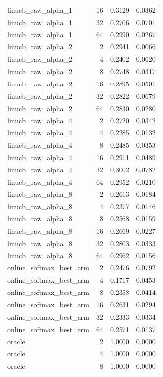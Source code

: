 \begin{table}[t]
\begin{tabular}{lrrr}
linucb\_raw\_alpha\_1 & 16 & 0.3129 & 0.0362 \\
linucb\_raw\_alpha\_1 & 32 & 0.2706 & 0.0701 \\
linucb\_raw\_alpha\_1 & 64 & 0.2990 & 0.0267 \\
linucb\_raw\_alpha\_2 & 2 & 0.2941 & 0.0066 \\
linucb\_raw\_alpha\_2 & 4 & 0.2402 & 0.0620 \\
linucb\_raw\_alpha\_2 & 8 & 0.2748 & 0.0317 \\
linucb\_raw\_alpha\_2 & 16 & 0.2895 & 0.0501 \\
linucb\_raw\_alpha\_2 & 32 & 0.2822 & 0.0679 \\
linucb\_raw\_alpha\_2 & 64 & 0.2830 & 0.0280 \\
linucb\_raw\_alpha\_4 & 2 & 0.2720 & 0.0342 \\
linucb\_raw\_alpha\_4 & 4 & 0.2285 & 0.0132 \\
linucb\_raw\_alpha\_4 & 8 & 0.2485 & 0.0353 \\
linucb\_raw\_alpha\_4 & 16 & 0.2911 & 0.0489 \\
linucb\_raw\_alpha\_4 & 32 & 0.3002 & 0.0782 \\
linucb\_raw\_alpha\_4 & 64 & 0.2952 & 0.0210 \\
linucb\_raw\_alpha\_8 & 2 & 0.2613 & 0.0184 \\
linucb\_raw\_alpha\_8 & 4 & 0.2377 & 0.0146 \\
linucb\_raw\_alpha\_8 & 8 & 0.2568 & 0.0159 \\
linucb\_raw\_alpha\_8 & 16 & 0.2669 & 0.0227 \\
linucb\_raw\_alpha\_8 & 32 & 0.2803 & 0.0333 \\
linucb\_raw\_alpha\_8 & 64 & 0.2962 & 0.0156 \\
online\_softmax\_best\_arm & 2 & 0.2476 & 0.0792 \\
online\_softmax\_best\_arm & 4 & 0.1717 & 0.0453 \\
online\_softmax\_best\_arm & 8 & 0.2358 & 0.0414 \\
online\_softmax\_best\_arm & 16 & 0.2631 & 0.0294 \\
online\_softmax\_best\_arm & 32 & 0.2333 & 0.0334 \\
online\_softmax\_best\_arm & 64 & 0.2571 & 0.0137 \\
oracle & 2 & 1.0000 & 0.0000 \\
oracle & 4 & 1.0000 & 0.0000 \\
oracle & 8 & 1.0000 & 0.0000 \\

\end{tabular}
\end{table}
